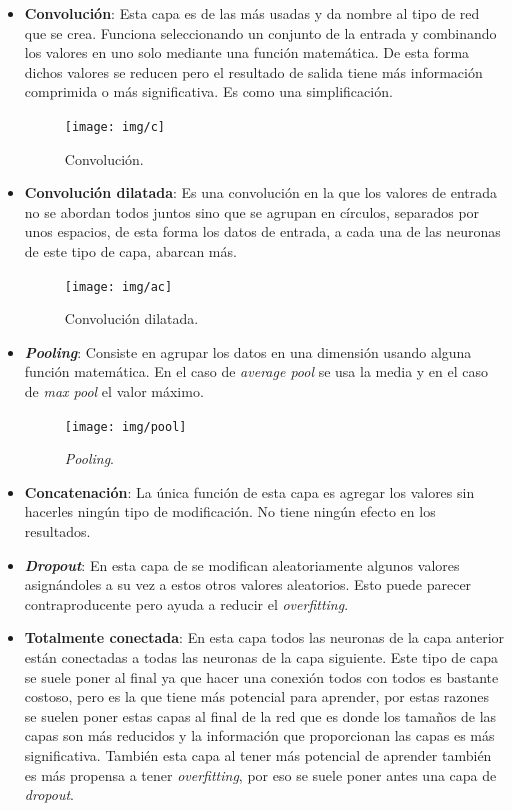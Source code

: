 \documentclass[12pt,a4paper]{article}
\begin{document}
\begin{itemize}
\item \textbf{Convolución}: Esta capa es de las más usadas y da nombre al tipo de red que se crea. Funciona seleccionando un conjunto de la entrada y combinando los valores en uno solo mediante una función matemática. De esta forma dichos valores se reducen pero el resultado de salida tiene más información comprimida o más significativa. Es como una simplificación.

\begin{figure}[H]
\centering
\texttt{[image: img/c]}
\caption{Convolución.}
\end{figure}

\item \textbf{Convolución dilatada}: Es una convolución en la que los valores de entrada no se abordan todos juntos sino que se agrupan en círculos, separados por unos espacios, de esta forma los datos de entrada, a cada una de las neuronas de este tipo de capa, abarcan más.

\begin{figure}[H]
\centering
\texttt{[image: img/ac]}
\caption{Convolución dilatada.}
\end{figure}

\item \textbf{\textit{Pooling}}: Consiste en agrupar los datos en una dimensión usando alguna función matemática. En el caso de \textit{average pool} se usa la media y en el caso de \textit{max pool} el valor máximo.

\begin{figure}[H]
\centering
\texttt{[image: img/pool]}
\caption{\textit{Pooling}.}
\end{figure}

\item \textbf{Concatenación}: La única función de esta capa es agregar los valores sin hacerles ningún tipo de modificación. No tiene ningún efecto en los resultados.

\item \textbf{\textit{Dropout}}: En esta capa de se modifican aleatoriamente algunos valores asignándoles a su vez a estos otros valores aleatorios. Esto puede parecer contraproducente pero ayuda a reducir el \textit{overfitting}.

\item \textbf{Totalmente conectada}: En esta capa todos las neuronas de la capa anterior están conectadas a todas las neuronas de la capa siguiente. Este tipo de capa se suele poner al final ya que hacer una conexión todos con todos es bastante costoso, pero es la que tiene más potencial para aprender, por estas razones se suelen poner estas capas al final de la red que es donde los tamaños de las capas son más reducidos y la información que proporcionan las capas es más significativa. También esta capa al tener más potencial de aprender también es más propensa a tener \textit{overfitting}, por eso se suele poner antes una capa de \textit{dropout}.


\end{itemize}
\end{document}
